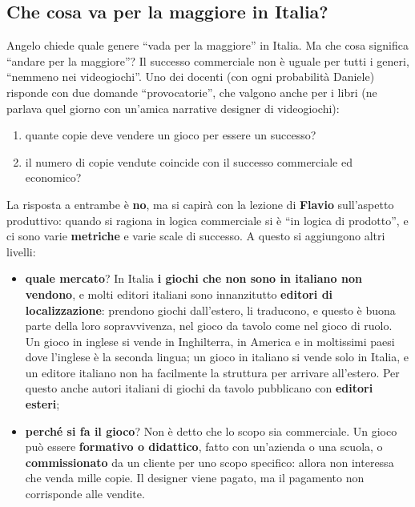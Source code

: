 \subsection{Che cosa va per la maggiore in Italia?}

Angelo chiede quale genere ``vada per la maggiore'' in Italia. Ma che cosa
significa ``andare per la maggiore''? Il successo commerciale non è uguale per
tutti i generi, ``nemmeno nei videogiochi''. Uno dei docenti (con ogni probabilità Daniele) risponde con due domande
``provocatorie'', che valgono anche per i libri (ne parlava quel giorno con
un'amica narrative designer di videogiochi):
\begin{enumerate}
  \item quante copie deve vendere un gioco per essere un successo?
  \item il numero di copie vendute coincide con il successo
        commerciale ed economico?
\end{enumerate}
La risposta a entrambe è \textbf{no}, ma si capirà con la lezione di
\textbf{Flavio} sull'aspetto produttivo: quando si ragiona in logica commerciale
si è ``in logica di prodotto'', e ci sono varie \textbf{metriche} e varie scale di
successo. A questo si aggiungono altri livelli:
\begin{itemize}
  \item \textbf{quale mercato}? In Italia \textbf{i giochi che non sono in
        italiano non vendono}, e molti editori italiani sono innanzitutto
        \textbf{editori di localizzazione}: prendono giochi dall'estero, li
        traducono, e questo è buona parte della loro sopravvivenza, nel gioco
        da tavolo come nel gioco di ruolo. Un gioco in inglese si vende in
        Inghilterra, in America e in moltissimi paesi dove l'inglese è la seconda
        lingua; un gioco in italiano si vende solo in Italia, e un editore
        italiano non ha facilmente la struttura per arrivare all'estero. Per
        questo anche autori italiani di giochi da tavolo pubblicano con
        \textbf{editori esteri};
  \item \textbf{perché si fa il gioco}? Non è detto che lo scopo sia
        commerciale. Un gioco può essere \textbf{formativo o didattico}, fatto
        con un'azienda o una scuola, o \textbf{commissionato} da un cliente per
        uno scopo specifico: allora non interessa che venda mille copie. Il
        designer viene pagato, ma il pagamento non corrisponde alle vendite.
\end{itemize}

